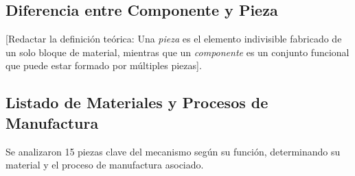 \documentclass[11pt, a4paper]{article}
\begin{document}
\subsection{Diferencia entre Componente y Pieza}
[Redactar la definición teórica: Una \textit{pieza} es el elemento indivisible fabricado de un solo bloque de material, mientras que un \textit{componente} es un conjunto funcional que puede estar formado por múltiples piezas].

\subsection{Listado de Materiales y Procesos de Manufactura}

Se analizaron 15 piezas clave del mecanismo según su función, determinando su material y el proceso de manufactura asociado.
\end{document}
